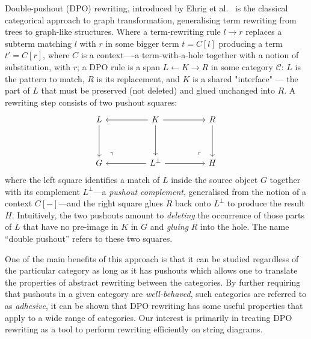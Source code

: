 Double-pushout (DPO) rewriting, introduced by Ehrig et al.~\cite{ehrigGraphgrammarsAlgebraicApproach1973} is the classical categorical approach to graph transformation, generalising term rewriting from trees to graph-like structures. 
Where a term-rewriting rule $l \to r$ replaces a subterm matching $l$ with $r$ in some bigger term $t = C[l]$ producing a term $t' = C[r]$, where $C$ is a context----a term-with-a-hole together with a notion of substitution, with $r$; a DPO rule is a span $L \xleftarrow{} K \xrightarrow{} R$ in some category $\mathcal{C}$:
$L$ is the pattern to match, $R$ is its replacement, and $K$ is a shared "interface" — the part of $L$ that must be preserved (not deleted) and glued unchanged into $R$. A rewriting step consists of two pushout squares:
\begin{equation}\label{eq:dpo_rewriting}
  \begin{tikzcd}
	L && K && R \\
	\\
	G && {L^{\bot}} && H
	\arrow[from=1-1, to=3-1]
	\arrow[from=1-3, to=1-1]
	\arrow[from=1-3, to=1-5]
	\arrow[from=1-3, to=3-3]
	\arrow[from=1-5, to=3-5]
	\arrow["\lrcorner"{anchor=center, pos=0.125, rotate=90}, draw=none, from=3-1, to=1-3]
	\arrow[from=3-3, to=3-1]
	\arrow[from=3-3, to=3-5]
	\arrow["\lrcorner"{anchor=center, pos=0.125, rotate=180}, draw=none, from=3-5, to=1-3]
\end{tikzcd}
\end{equation}
where the left square identifies a match of $L$ inside the source object $G$ together with its complement $L^{\bot}$---a \emph{pushout complement}, generalised from the notion of a context $C[-]$---and the right square glues $R$  back onto $L^{\bot}$ to produce the result $H$. 
Intuitively, the two pushouts amount to \emph{deleting} the occurrence of those parts of $L$ that have no pre-image in $K$ in $G$ and \emph{gluing} $R$ into the hole.
The name \enquote{double pushout} refers to these two squares.

One of the main benefits of this approach is that it can be studied regardless of the particular category as long as it has pushouts which allows one to translate the properties of abstract rewriting between the categories.
By further requiring that pushouts in a given category are \emph{well-behaved}, such categories are referred to as \emph{adhesive}, it can be shown that DPO rewriting has some useful properties that apply to a wide range of categories.
Our interest is primarily in treating DPO rewriting as a tool to perform rewriting efficiently on string diagrams.


